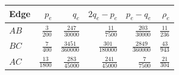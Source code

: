 \begin{tabular}{@{}lrrrrr@{}}\toprule
Edge & $p_e$ & $q_e$ & $2q_e-p_e$ & $p_e-q_e$ & $\rho_e$ \\\midrule
$AB$ & $\frac{3}{200}$ & $\frac{247}{30000}$ & $\frac{11}{7500}$ & $\frac{203}{30000}$ & $\frac{11}{236}$ \\
$BC$ & $\frac{7}{400}$ & $\frac{3451}{360000}$ & $\frac{301}{180000}$ & $\frac{2849}{360000}$ & $\frac{43}{943}$ \\
$AC$ & $\frac{13}{1800}$ & $\frac{283}{45000}$ & $\frac{241}{45000}$ & $\frac{7}{7500}$ & $\frac{21}{304}$ \\
\bottomrule\end{tabular}
